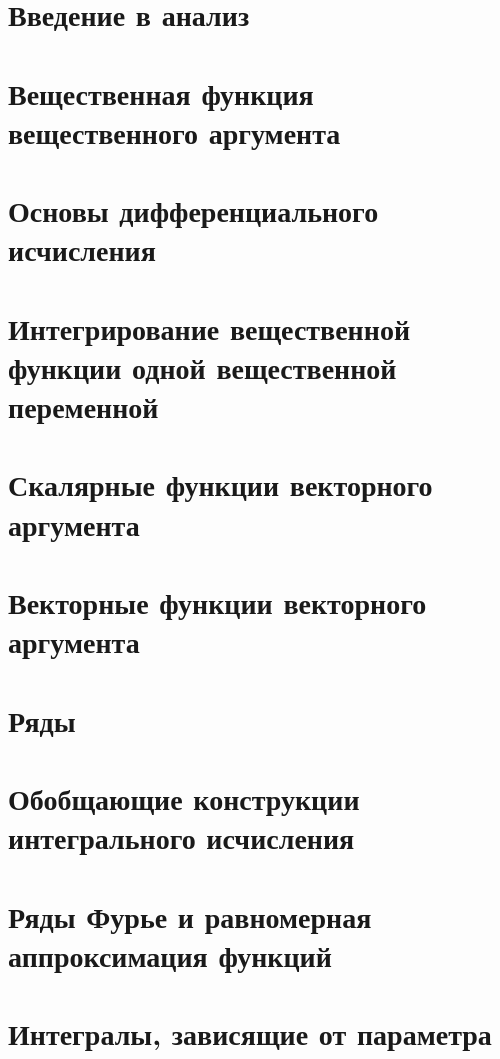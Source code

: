 
\LARGE


\tableofcontents %
\LARGE

\chapter{Введение в анализ}

\chapter{Вещественная функция вещественного аргумента}

\chapter{Основы дифференциального исчисления}

\chapter{Интегрирование вещественной функции одной вещественной переменной}

\chapter{Скалярные функции векторного аргумента}

\chapter{Векторные функции векторного аргумента}

\chapter{Ряды}

\chapter{Обобщающие конструкции интегрального исчисления}

\chapter{Ряды Фурье и равномерная аппроксимация функций}

\chapter{Интегралы, зависящие от параметра}




